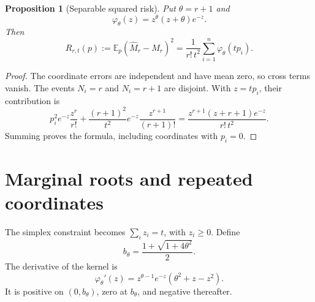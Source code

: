 \documentclass[11pt]{article}
\newtheorem{proposition}[theorem]{Proposition}
\theoremstyle{remark}\newtheorem{remark}[theorem]{Remark}
\newcommand{\E}{\mathbb E}
\begin{document}
\begin{proposition}[Separable squared risk]\label{prop:risk}
Put \(\theta=r+1\) and
\[
\varphi_\theta(z)=z^\theta(z+\theta)e^{-z}.
\]
Then
\[
R_{r,t}(p):=\E_p(\widehat M_r-M_r)^2
=\frac{1}{r!\,t^2}\sum_{i=1}^n\varphi_\theta(tp_i).
\]
\end{proposition}
\begin{proof}
The coordinate errors are independent and have mean zero, so cross terms vanish. The events \(N_i=r\) and \(N_i=r+1\) are disjoint. With \(z=tp_i\), their contribution is
\[
p_i^2 e^{-z}\frac{z^r}{r!}
+\frac{(r+1)^2}{t^2}e^{-z}\frac{z^{r+1}}{(r+1)!}
=\frac{z^{r+1}(z+r+1)e^{-z}}{r!\,t^2}.
\]
Summing proves the formula, including coordinates with \(p_i=0\).
\end{proof}

\section{Marginal roots and repeated coordinates}
The simplex constraint becomes \(\sum_i z_i=t\), with \(z_i\ge0\). Define
\[
b_\theta=\frac{1+\sqrt{1+4\theta^2}}2.
\]
The derivative of the kernel is
\[
\varphi_\theta'(z)
=z^{\theta-1}e^{-z}(\theta^2+z-z^2).
\]
It is positive on \((0,b_\theta)\), zero at \(b_\theta\), and negative thereafter.
\end{document}
